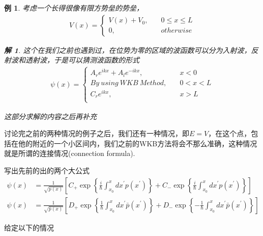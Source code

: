 \documentclass{article}
\newtheorem{example}{例}
\newtheorem{solution}{解}
\begin{document}
\begin{example}
	考虑一个长得很像有限方势垒的势垒，
	\begin{align*}
		V(x)=
		\begin{cases}
			V(x)+V_0, & \quad 0\leq x\leq L \\
			0,        & \quad otherwise
		\end{cases}
	\end{align*}
	\begin{solution}
		这个在我们之前也遇到过，在位势为零的区域的波函数可以分为入射波，反射波和透射波，于是可以猜测波函数的形式
		\begin{align*}
			\psi(x)=
			\begin{cases}
				A_re^{ikx}+A_le^{-ikx}, & \quad x<0   \\
				By\ using\ WKB\ Method, & \quad 0<x<L \\
				C_re^{ikx},             & \quad x>L   \\
			\end{cases}
		\end{align*}

		这部分求解的内容之后再补充
	\end{solution}
\end{example}


讨论完之前的两种情况的例子之后，我们还有一种情况，即$E=V$，在这个点，包括在他的附近的一个小区间内，我们之前的WKB方法将会不那么准确，这种情况就是所谓的连接情况(connection formula).

写出先前的出的两个大公式
\begin{align*}
	\psi(x) & =\frac{1}{\sqrt{p(x)}}\left[C_+\exp\left\{\frac{i}{\hbar}\int_{x_0}^{x}dx^\prime p(x^\prime)\right\}+C_-\exp\left\{\frac{i}{\hbar}\int_{x_0}^{x}dx^\prime p(x^\prime)\right\}\right]                  \\
	\psi(x) & =\frac{1}{\sqrt{\bar{p}(x)}}\left[D_+\exp\left\{\frac{1}{\hbar}\int_{x_0}^{x}dx^\prime\bar{p}(x^\prime)\right\}+D_-\exp\left\{-\frac{1}{\hbar}\int_{x_0}^{x}dx^\prime\bar{p}(x^\prime)\right\}\right]
\end{align*}

给定以下的情况
\begin{center}
\end{center}
\end{document}

